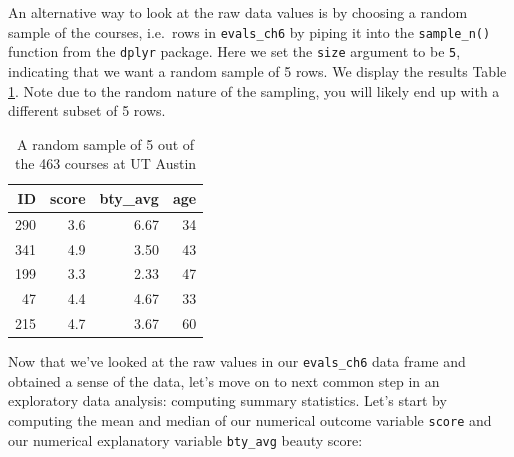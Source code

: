 \documentclass[12pt, krantz2,]{krantz}
\makeatletter
\newenvironment{Shaded}{\begin{snugshade}}{\end{snugshade}}
\newcommand{\DataTypeTok}[1]{\textcolor[rgb]{0.27,0.27,0.27}{#1}}
\newcommand{\DecValTok}[1]{\textcolor[rgb]{0.06,0.06,0.06}{#1}}
\newcommand{\KeywordTok}[1]{\textcolor[rgb]{0.27,0.27,0.27}{\textbf{#1}}}
\newcommand{\NormalTok}[1]{#1}
\newcommand{\OperatorTok}[1]{\textcolor[rgb]{0.43,0.43,0.43}{\textbf{#1}}}
\newcommand{\StringTok}[1]{\textcolor[rgb]{0.5,0.5,0.5}{#1}}
\newenvironment{kframe}{%
\medskip{}
\setlength{\fboxsep}{.8em}
 \def\at@end@of@kframe{}%
 \ifinner\ifhmode%
  \def\at@end@of@kframe{\end{minipage}}%
  \begin{minipage}{\columnwidth}%
 \fi\fi%
 \def\FrameCommand##1{\hskip\@totalleftmargin \hskip-\fboxsep
 \colorbox{shadecolor}{##1}\hskip-\fboxsep
     \hskip-\linewidth \hskip-\@totalleftmargin \hskip\columnwidth}%
 \MakeFramed {\advance\hsize-\width
   \@totalleftmargin\z@ \linewidth\hsize
   \@setminipage}}%
 {\par\unskip\endMakeFramed%
 \at@end@of@kframe}
\renewenvironment{Shaded}{\begin{kframe}}{\end{kframe}}
\makeatother
\begin{document}
An alternative way to look at the raw data values is by choosing a random sample of the courses, i.e.~rows in \texttt{evals\_ch6} by piping it into the \texttt{sample\_n()} function from the \texttt{dplyr} package. Here we set the \texttt{size} argument to be \texttt{5}, indicating that we want a random sample of 5 rows. We display the results Table \ref{tab:five-random-courses}. Note due to the random nature of the sampling, you will likely end up with a different subset of 5 rows.

\begin{Shaded}
\end{Shaded}

\begin{table}[H]

\caption{\label{tab:five-random-courses}A random sample of 5 out of the 463 courses at UT Austin}
\centering
\fontsize{10}{12}\selectfont
\begin{tabular}{rrrr}
\toprule
ID & score & bty\_avg & age\\
\midrule
290 & 3.6 & 6.67 & 34\\
341 & 4.9 & 3.50 & 43\\
199 & 3.3 & 2.33 & 47\\
47 & 4.4 & 4.67 & 33\\
215 & 4.7 & 3.67 & 60\\
\bottomrule
\end{tabular}
\end{table}

Now that we've looked at the raw values in our \texttt{evals\_ch6} data frame and obtained a sense of the data, let's move on to next common step in an exploratory data analysis: computing summary statistics. Let's start by computing the mean and median of our numerical outcome variable \texttt{score} and our numerical explanatory variable \texttt{bty\_avg} beauty score:

\begin{Shaded}
\end{Shaded}
\end{document}

